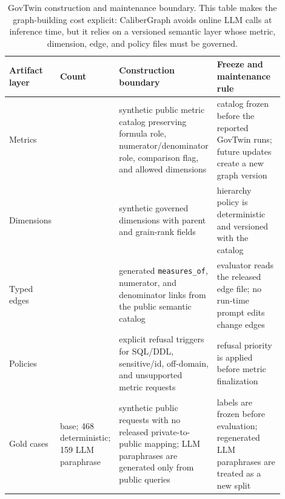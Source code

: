 \documentclass[letterpaper]{article}
\begin{document}
\begin{table}[t]
\centering
\scriptsize
\setlength{\tabcolsep}{2pt}
\begin{tabular}{@{}>{\raggedright\arraybackslash}p{0.18\linewidth}>{\raggedright\arraybackslash}p{0.13\linewidth}>{\raggedright\arraybackslash}p{0.29\linewidth}>{\raggedright\arraybackslash}p{0.30\linewidth}@{}}
\toprule
Artifact layer & Count & Construction boundary & Freeze and maintenance rule \\
\midrule
Metrics & 18 & synthetic public metric catalog preserving formula role, numerator/denominator role, comparison flag, and allowed dimensions & catalog frozen before the reported GovTwin runs; future updates create a new graph version \\
Dimensions & 5 & synthetic governed dimensions with parent and grain-rank fields & hierarchy policy is deterministic and versioned with the catalog \\
Typed edges & 102 & generated \texttt{measures\_of}, numerator, and denominator links from the public semantic catalog & evaluator reads the released edge file; no run-time prompt edits change edges \\
Policies & 4 & explicit refusal triggers for SQL/DDL, sensitive/id, off-domain, and unsupported metric requests & refusal priority is applied before metric finalization \\
Gold cases & 159 base; 468 deterministic; 159 LLM paraphrase & synthetic public requests with no released private-to-public mapping; LLM paraphrases are generated only from public queries & labels are frozen before evaluation; regenerated LLM paraphrases are treated as a new split \\
\bottomrule
\end{tabular}
\caption{GovTwin construction and maintenance boundary. This table makes the graph-building cost explicit: CaliberGraph avoids online LLM calls at inference time, but it relies on a versioned semantic layer whose metric, dimension, edge, and policy files must be governed.}
\end{table}
\end{document}
